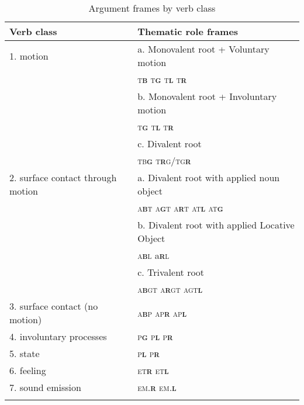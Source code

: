 \documentclass[output=paper]{langsci/langscibook}
\begin{document}
\begin{table}
\caption{Argument frames by verb class}
\label{tab:sibanda:2}

\begin{tabularx}{\textwidth}{XX}
\lsptoprule
{Verb class} & {Thematic role frames}\\
\midrule

{1. motion} & {a. Monovalent root + Voluntary motion} \\
& \textsc{t}\textbf{\textsc{b}} \textsc{t}\textbf{\textsc{g}} \textsc{t}\textbf{\textsc{l}} \textsc{t}\textbf{\textsc{r}} \\
& {b. Monovalent root + Involuntary motion} \\
& \textsc{t}\textbf{\textsc{g}} \textsc{t}\textbf{\textsc{l}} \textsc{t}\textbf{\textsc{r}} \\
& {c. Divalent root} \\
& \textsc{tb}\textbf{\textsc{g}} \textsc{t}\textbf{\textsc{r}}\textsc{g/tg}\textbf{\textsc{r}}\\

{2. surface contact through motion} & {a. Divalent root with applied noun object} \\
& \textsc{a}\textbf{\textsc{b}}\textsc{t} \textsc{a}\textbf{\textsc{g}}\textsc{t} \textsc{a}\textbf{\textsc{r}}\textsc{t} \textsc{at}\textbf{\textsc{l}} \textsc{at}\textbf{\textsc{g}} \\
& {b. Divalent root with applied Locative Object} \\
& \textsc{a}\textbf{\textsc{b}}\textsc{l} {a}\textbf{\textsc{r}}\textsc{l} \\
& {c. Trivalent root} \\
& \textsc{a}\textbf{\textsc{b}}\textsc{gt} \textsc{a}\textbf{\textsc{r}}\textsc{gt} \textsc{agt}\textbf{\textsc{l}}\\

{3. surface contact (no motion)} & {\textsc{a}\textbf{\textsc{b}}\textsc{p ap}\textbf{\textsc{r}} \textsc{ap}\textbf{\textsc{l}}}\\

{4. involuntary processes}  & {\textsc{p}\textbf{\textsc{g}} \textsc{p}\textbf{\textsc{l}} \textsc{p}\textbf{\textsc{r}}}\\

{5. state} & {\textsc{p}\textbf{\textsc{l}} \textsc{p}\textbf{\textsc{r}}}\\

{6. feeling} & {\textsc{et}\textbf{\textsc{r}} \textsc{et}\textbf{\textsc{l}}}\\

{7. sound emission}  & {\textsc{em.}\textbf{\textsc{r}} \textsc{em.}\textbf{\textsc{l}}}\\
\lspbottomrule
\end{tabularx}
\end{table}
\end{document}
